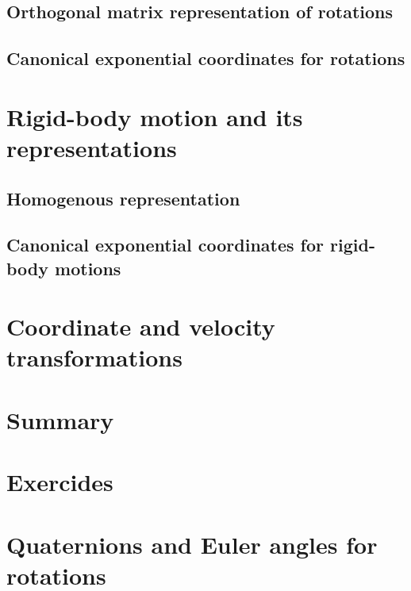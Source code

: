 \documentclass{book}
\begin{document}
\subsection{Orthogonal matrix representation of rotations}

\subsection{Canonical exponential coordinates for rotations}

\section{Rigid-body motion and its representations}

\subsection{Homogenous representation}

\subsection{Canonical exponential coordinates for rigid-body motions}

\section{Coordinate and velocity transformations}

\section{Summary}

\section{Exercides}

\section{Quaternions and Euler angles for rotations}
\end{document}
